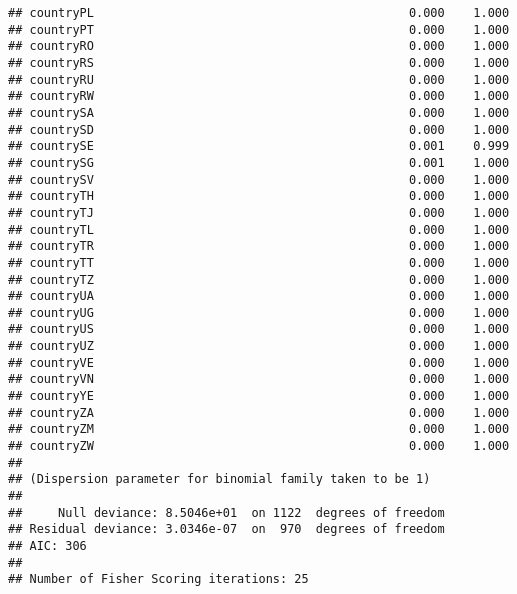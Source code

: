 \documentclass[
]{article}
\begin{document}
\begin{verbatim}
## countryPL                                            0.000    1.000
## countryPT                                            0.000    1.000
## countryRO                                            0.000    1.000
## countryRS                                            0.000    1.000
## countryRU                                            0.000    1.000
## countryRW                                            0.000    1.000
## countrySA                                            0.000    1.000
## countrySD                                            0.000    1.000
## countrySE                                            0.001    0.999
## countrySG                                            0.001    1.000
## countrySV                                            0.000    1.000
## countryTH                                            0.000    1.000
## countryTJ                                            0.000    1.000
## countryTL                                            0.000    1.000
## countryTR                                            0.000    1.000
## countryTT                                            0.000    1.000
## countryTZ                                            0.000    1.000
## countryUA                                            0.000    1.000
## countryUG                                            0.000    1.000
## countryUS                                            0.000    1.000
## countryUZ                                            0.000    1.000
## countryVE                                            0.000    1.000
## countryVN                                            0.000    1.000
## countryYE                                            0.000    1.000
## countryZA                                            0.000    1.000
## countryZM                                            0.000    1.000
## countryZW                                            0.000    1.000
## 
## (Dispersion parameter for binomial family taken to be 1)
## 
##     Null deviance: 8.5046e+01  on 1122  degrees of freedom
## Residual deviance: 3.0346e-07  on  970  degrees of freedom
## AIC: 306
## 
## Number of Fisher Scoring iterations: 25
\end{verbatim}
\end{document}
